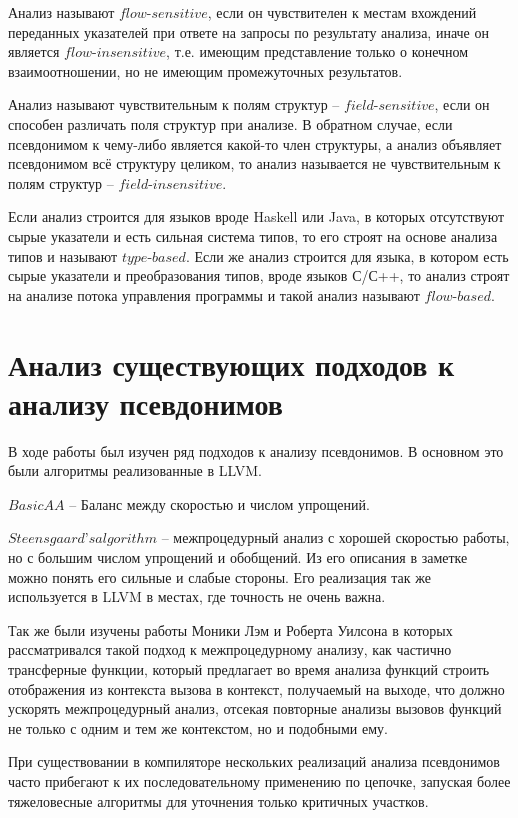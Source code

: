 Анализ называют $flow$-$sensitive$, если он чувствителен к местам вхождений переданных указателей при ответе на запросы по результату анализа, иначе он является $flow$-$insensitive$, т.е. имеющим представление только о конечном взаимоотношении, но не имеющим промежуточных результатов.

Анализ называют чувствительным к полям структур -- $field$-$sensitive$, если он способен различать поля структур при анализе. В обратном случае, если псевдонимом к чему-либо является какой-то член структуры, а анализ объявляет псевдонимом всё структуру целиком, то анализ называется не чувствительным к полям структур -- $field$-$insensitive$.

Если анализ строится для языков вроде Haskell или Java, в которых отсутствуют сырые указатели и есть сильная система типов, то его строят на основе анализа типов и называют $type$-$based$. Если же анализ строится для языка, в котором есть сырые указатели и преобразования типов, вроде языков С/С++, то анализ строят на анализе потока управления программы и такой анализ называют $flow$-$based$.

\section{Анализ существующих подходов к анализу псевдонимов}

В ходе работы был изучен ряд подходов к анализу псевдонимов. В основном это были алгоритмы реализованные в LLVM. 

$BasicAA$ -- Баланс между скоростью и числом упрощений.

$Steensgaard’s algorithm$ -- межпроцедурный анализ с хорошей скоростью работы, но с большим числом упрощений и обобщений. Из его описания в заметке ~\autocite{SteensgaardsNote} можно понять его сильные и слабые стороны. Его реализация так же используется в LLVM в местах, где точность не очень важна.

Так же были изучены работы Моники Лэм и Роберта Уилсона  в которых рассматривался такой подход к межпроцедурному анализу, как частично трансферные функции, который предлагает во время анализа функций строить отображения из контекста вызова в контекст, получаемый на выходе, что должно ускорять межпроцедурный анализ, отсекая повторные анализы вызовов функций не только с одним и тем же контекстом, но и подобными ему.

При существовании в компиляторе нескольких реализаций анализа псевдонимов часто прибегают к их последовательному применению по цепочке, запуская более тяжеловесные алгоритмы для уточнения только критичных участков.

